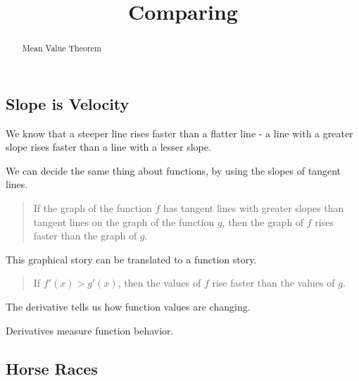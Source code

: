 \documentclass{ximera}
\title{Comparing}
\begin{document}
\begin{abstract}
Mean Value Theorem
\end{abstract}
\maketitle






\subsection*{Slope is Velocity}



We know that a steeper line rises faster than a flatter line - a line with a greater slope rises faster than a line with a lesser slope. 


We can decide the same thing about functions, by using the slopes of tangent lines.


\begin{quote}

If the graph of the function $f$ has tangent lines with greater slopes than tangent lines on the graph of the function $g$, then the graph of $f$ rises faster than the graph of $g$.

\end{quote}


This graphical story can be translated to a function story.  


\begin{quote}

If $f'(x) > g'(x)$, then the values of $f$ rise faster than the values of $g$.

\end{quote}





The derivative tells us how function values are changing.

Derivatives measure function behavior. 






















\subsection*{Horse Races}
\end{document}
